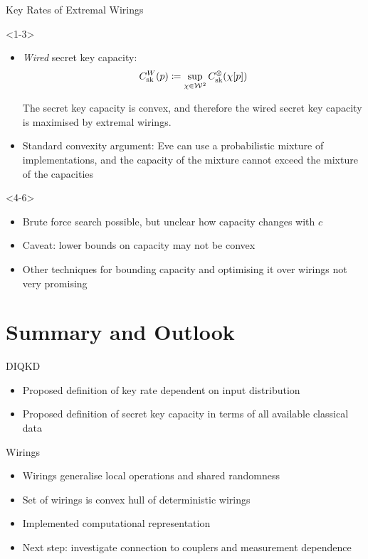 \documentclass[xcolor=dvipsnames]{beamer}
\newcommand{\?}{\mathrel{?}} %
\newcommand{\sW}{\mathcal{W}}
\newcommand{\sk}{\rm sk}
\begin{document}
\begin{frame}{Key Rates of Extremal Wirings}
  \begin{onlyenv}<1-3>
    \begin{itemize}[<+->]
      \item \emph{Wired} secret key capacity:
        \[ C^{W}_{\sk}(p) \coloneqq \sup_{\chi\in\sW^2} C^{\otimes}_{\sk}(\chi[p]) \]
        \begin{theorem}
          The secret key capacity is convex, and therefore the wired secret key capacity is maximised by extremal wirings.
        \end{theorem}
      \item Standard convexity argument: Eve can use a probabilistic mixture of implementations, and the capacity of the mixture cannot exceed the mixture of the capacities
    \end{itemize}
  \end{onlyenv}
  \begin{onlyenv}<4-6>
    \begin{itemize}[<+->]
      \item Brute force search possible, but unclear how capacity changes with \(c\)
      \item Caveat: lower bounds on capacity may not be convex
      \item Other techniques for bounding capacity and optimising it over wirings not very promising
    \end{itemize}
  \end{onlyenv}
\end{frame}

\section*{Summary and Outlook}

\begin{frame}{DIQKD}
  \begin{itemize}[<+->]
    \item Proposed definition of key rate dependent on input distribution
    \item Proposed definition of secret key capacity in terms of all available classical data
  \end{itemize}
\end{frame}

\begin{frame}{Wirings}
  \begin{itemize}[<+->]
    \item Wirings generalise local operations and shared randomness
    \item Set of wirings is convex hull of deterministic wirings
    \item Implemented computational representation
    \item Next step: investigate connection to couplers and measurement dependence
  \end{itemize}
\end{frame}
\end{document}
